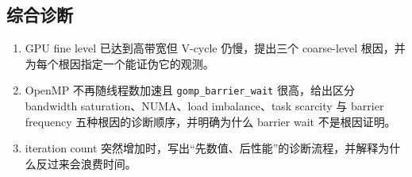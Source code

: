 \subsection*{综合诊断}
\begin{enumerate}[label=\arabic*.]
\item GPU fine level 已达到高带宽但 V-cycle 仍慢，提出三个 coarse-level 根因，并为每个根因指定一个能证伪它的观测。
\item OpenMP 不再随线程数加速且 \texttt{gomp\_barrier\_wait} 很高，给出区分 bandwidth saturation、NUMA、load imbalance、task scarcity 与 barrier frequency 五种根因的诊断顺序，并明确为什么 barrier wait 不是根因证明。
\item iteration count 突然增加时，写出“先数值、后性能”的诊断流程，并解释为什么反过来会浪费时间。
\end{enumerate}
